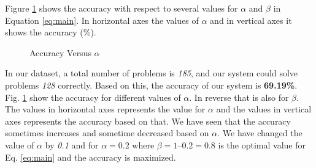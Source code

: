 \documentclass[document.tex]{subfiles}
\begin{document}
Figure \ref{fig:accvsalpha} shows the accuracy with respect to several values for $\alpha$ and $\beta$ in Equation \ref{eq:main}. In horizontal axes the values of $\alpha$ and in vertical axes it shows the accuracy (\%).
\begin{figure}[H]
	\begin{center}
	\end{center}
	\caption{Accuracy Versus $\alpha$}
	\label{fig:accvsalpha}
\end{figure}

In our dataset, a total number of problems is \textit{185}, and our system could solve problems \textit{128} correctly. Based on this, the accuracy of our system is \textbf{69.19\%}. Fig. \ref{fig:accvsalpha} show the accuracy for different values of $\alpha$. In reverse that is also for $\beta$. The values in horizontal axes represents the value for $\alpha$ and the values in vertical axes represents the accuracy based on that. We have seen that the accuracy sometimes increases and sometime decreased based on $\alpha$. We have changed the value of $\alpha$ by \textit{0.1} and for $\alpha=0.2$ where $\beta = 1 – 0.2 = 0.8$ is the optimal value for Eq. \ref{eq:main} and the accuracy is maximized.
\end{document}
